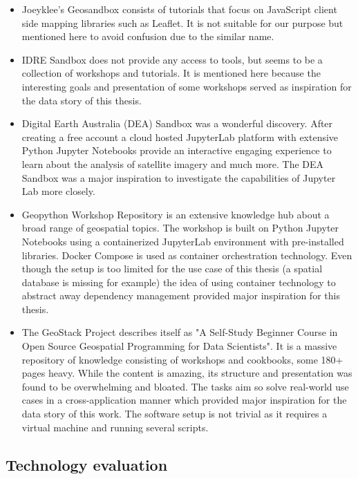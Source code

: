 \documentclass[11pt, a4paper, oneside, parskip=full-]{scrartcl}
\begin{document}
\begin{itemize}
  \item Joeyklee's Geosandbox\cite{project-joeyklee} consists of tutorials that
  focus on JavaScript client side mapping libraries such as Leaflet. It is not
  suitable for our purpose but mentioned here to avoid confusion due to the
  similar name.
  \item IDRE Sandbox\cite{project-idre} does not provide any access to tools,
  but seems to be a collection of workshops and tutorials. It is mentioned here
  because the interesting goals and presentation of some workshops served as
  inspiration for the data story of this thesis.
  \item Digital Earth Australia (DEA) Sandbox\cite{project-dea} was a wonderful
  discovery. After creating a free account a cloud hosted
  JupyterLab\cite{jupyterlab} platform with extensive Python Jupyter Notebooks
  provide an interactive engaging experience to learn about the analysis of
  satellite imagery and much more. The DEA Sandbox was a major inspiration to
  investigate the capabilities of Jupyter Lab more closely.
  \item Geopython Workshop Repository\cite{project-geopython} is an extensive
  knowledge hub about a broad range of geospatial topics. The workshop is built
  on Python Jupyter Notebooks using a containerized JupyterLab environment with
  pre-installed libraries. Docker Compose\cite{dockercompose} is used as
  container orchestration technology. Even though the setup is too limited for
  the use case of this thesis (a spatial database is missing for example) the
  idea of using container technology to abstract away dependency management
  provided major inspiration for this thesis.
  \item The GeoStack Project\cite{project-geostack} describes itself as "A
  Self-Study Beginner Course in Open Source Geospatial Programming for Data
  Scientists". It is a massive repository of knowledge consisting of workshops
  and cookbooks, some 180+ pages heavy. While the content is amazing, its
  structure and presentation was found to be overwhelming and bloated. The tasks
  aim so solve real-world use cases in a cross-application manner which provided
  major inspiration for the data story of this work. The software setup is not
  trivial as it requires a virtual machine and running several scripts.
\end{itemize}

\subsection{Technology evaluation}
\end{document}
